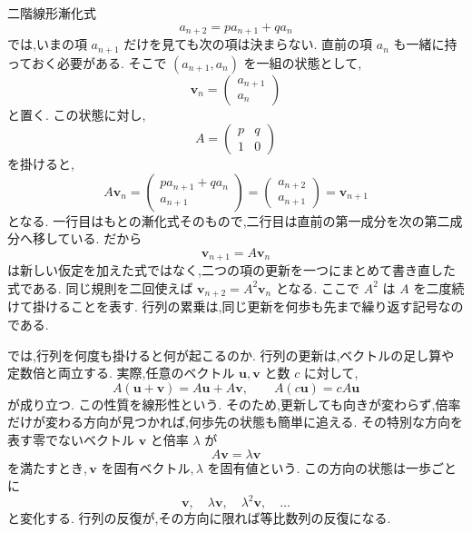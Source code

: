 二階線形漸化式
\[
  a_{n+2}=p a_{n+1}+q a_n
\]
では,いまの項 $a_{n+1}$ だけを見ても次の項は決まらない.
直前の項 $a_n$ も一緒に持っておく必要がある.
そこで $(a_{n+1},a_n)$ を一組の状態として,
\[
  \boldsymbol v_n=
  \begin{pmatrix}a_{n+1}\\a_n\end{pmatrix}
\]
と置く.
この状態に対し,
\[
  A=\begin{pmatrix}p&q\\1&0\end{pmatrix}
\]
を掛けると,
\[
  A\boldsymbol v_n
  =
  \begin{pmatrix}p a_{n+1}+q a_n\\a_{n+1}\end{pmatrix}
  =
  \begin{pmatrix}a_{n+2}\\a_{n+1}\end{pmatrix}
  =\boldsymbol v_{n+1}
\]
となる.
一行目はもとの漸化式そのもので,二行目は直前の第一成分を次の第二成分へ移している.
だから
\[
  \boldsymbol v_{n+1}=A\boldsymbol v_n
\]
は新しい仮定を加えた式ではなく,二つの項の更新を一つにまとめて書き直した式である.
同じ規則を二回使えば $\boldsymbol v_{n+2}=A^2\boldsymbol v_n$ となる.
ここで $A^2$ は $A$ を二度続けて掛けることを表す.
行列の累乗は,同じ更新を何歩も先まで繰り返す記号なのである.

では,行列を何度も掛けると何が起こるのか.
行列の更新は,ベクトルの足し算や定数倍と両立する.
実際,任意のベクトル $\boldsymbol u,\boldsymbol v$ と数 $c$ に対して,
\[
  A(\boldsymbol u+\boldsymbol v)
  =A\boldsymbol u+A\boldsymbol v,
  \qquad
  A(c\boldsymbol u)=cA\boldsymbol u
\]
が成り立つ.
この性質を線形性という.
そのため,更新しても向きが変わらず,倍率だけが変わる方向が見つかれば,何歩先の状態も簡単に追える.
その特別な方向を表す零でないベクトル $\boldsymbol v$ と倍率 $\lambda$ が
\[
  A\boldsymbol v=\lambda\boldsymbol v
\]
を満たすとき,\,$\boldsymbol v$ を固有ベクトル,\,$\lambda$ を固有値という.
この方向の状態は一歩ごとに
\[
  \boldsymbol v,\quad \lambda\boldsymbol v,\quad
  \lambda^2\boldsymbol v,\quad\ldots
\]
と変化する.
行列の反復が,その方向に限れば等比数列の反復になる.


